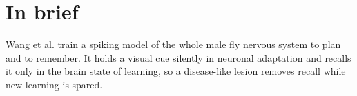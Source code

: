 \section{In brief}
\noindent Wang et al. train a spiking model of the whole male fly nervous system to plan and to remember. It holds a visual cue
silently in neuronal adaptation and recalls it only in the brain state of learning, so a disease-like lesion removes recall
while new learning is spared.

